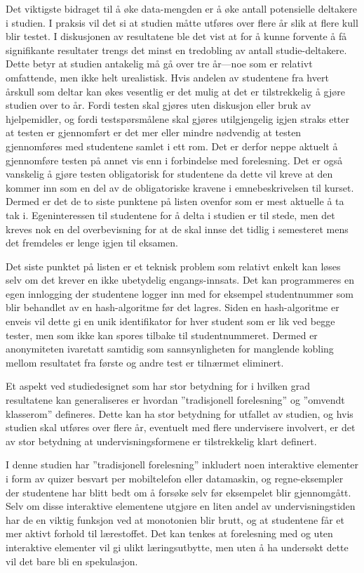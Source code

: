 \documentclass[a4paper,norsk,12pt]{article}
\begin{document}
Det viktigste bidraget til å øke data-mengden er å øke antall potensielle deltakere i studien. I praksis vil det si at studien måtte utføres over flere år slik at flere kull blir testet. I diskusjonen av resultatene ble det vist at for å kunne forvente å få signifikante resultater trengs det minst en tredobling av antall studie-deltakere. Dette betyr at studien antakelig må gå over tre år---noe som er relativt omfattende, men ikke helt urealistisk. Hvis andelen av studentene fra hvert årskull som deltar kan økes vesentlig er det mulig at det er tilstrekkelig å gjøre studien over to år. Fordi testen skal gjøres uten diskusjon eller bruk av hjelpemidler, og fordi testspørsmålene skal gjøres utilgjengelig igjen straks etter at testen er gjennomført er det mer eller mindre nødvendig at testen gjennomføres med studentene samlet i ett rom. Det er derfor neppe aktuelt å gjennomføre testen på annet vis enn i forbindelse med forelesning. Det er også vanskelig å gjøre testen obligatorisk for studentene da dette vil kreve at den kommer inn som en del av de obligatoriske kravene i emnebeskrivelsen til kurset. Dermed er det de to siste punktene på listen ovenfor som er mest aktuelle å ta tak i. Egeninteressen til studentene for å delta i studien er til stede, men det kreves nok en del overbevisning for at de skal innse det tidlig i semesteret mens det fremdeles er lenge igjen til eksamen. 

Det siste punktet på listen er et teknisk problem som relativt enkelt kan løses selv om det krever en ikke ubetydelig engangs-innsats. Det kan programmeres en egen innlogging der studentene logger inn med for eksempel studentnummer som blir behandlet av en hash-algoritme før det lagres. Siden en hash-algoritme er enveis vil dette gi en unik identifikator for hver student som er lik ved begge tester, men som ikke kan spores tilbake til studentnummeret. Dermed er anonymiteten ivaretatt samtidig som sannsynligheten for manglende kobling mellom resultatet fra første og andre test er tilnærmet eliminert.

Et  aspekt ved studiedesignet som har stor betydning for i hvilken grad resultatene kan generaliseres er hvordan ''tradisjonell forelesning'' og ''omvendt klasserom'' defineres. Dette kan ha stor betydning for utfallet av studien, og hvis studien skal utføres over flere år, eventuelt med flere undervisere involvert, er det av stor betydning at undervisningsformene er tilstrekkelig klart definert. 

I denne studien har ''tradisjonell forelesning'' inkludert noen interaktive elementer i form av quizer besvart per mobiltelefon eller datamaskin, og regne-eksempler der studentene har blitt bedt om å forsøke selv før eksempelet blir gjennomgått. Selv om disse interaktive elementene utgjøre en liten andel av undervisningstiden har de en viktig funksjon ved at monotonien blir brutt, og at studentene får et mer aktivt forhold til lærestoffet. Det kan tenkes at forelesning med og uten interaktive elementer vil gi ulikt læringsutbytte, men uten å ha undersøkt dette vil det bare bli en spekulasjon.
\end{document}
